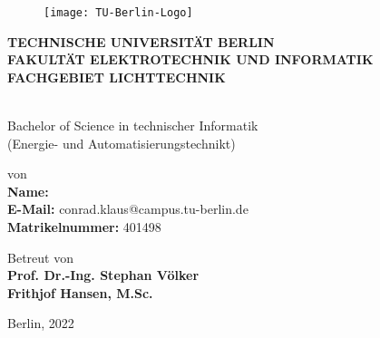 \thispagestyle{empty} %

\begin{center}
	\begin{figure}
		\begin{center}
			\texttt{[image: TU-Berlin-Logo]}
		\end{center}
	\end{figure}
	\small
	\textbf{TECHNISCHE  UNIVERSITÄT BERLIN\\
		FAKULTÄT ELEKTROTECHNIK UND INFORMATIK\\
		FACHGEBIET LICHTTECHNIK}
	
	\vfill
	\Large
	\textbf{{\ttitle}} \\ 
	
	\vfill
	\small
	Bachelor of Science  in technischer Informatik  \\
	(Energie- und Automatisierungstechnikt)\\
	\vspace*{0.5cm}
	
	\vfill
	\small
	von\\
	\large
	\textbf{Name:} {\authornames}\\
	\textbf{E-Mail:} conrad.klaus@campus.tu-berlin.de\\
	\textbf{Matrikelnummer:} 401498 \\
	
	\small
	
	\vfill
	\small
	Betreut von\\
	\normalsize
	\textbf{Prof. Dr.-Ing. Stephan Völker\\
		Frithjof Hansen, M.Sc.}
	
	\vfill
	\small
	Berlin, 2022\\
	
\end{center}
